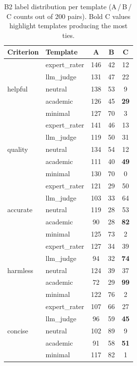 \documentclass[11pt,a4paper]{article}
\begin{document}
\begin{table}[htbp]
\centering
\small
\caption{B2 label distribution per template (A\,/\,B\,/\,C counts out of 200
pairs). Bold C values highlight templates producing the most ties.}
\label{tab:b2-labels}
\begin{tabular}{@{}llccc@{}}
  \toprule
  \textbf{Criterion} & \textbf{Template} & \textbf{A} & \textbf{B} & \textbf{C} \\
  \midrule
  \multirow{5}{*}{helpful}
    & expert\_rater & 146 & 42 & 12 \\
    & llm\_judge    & 131 & 47 & 22 \\
    & neutral       & 138 & 53 &  9 \\
    & academic      & 126 & 45 & \textbf{29} \\
    & minimal       & 127 & 70 &  3 \\
  \midrule
  \multirow{5}{*}{quality}
    & expert\_rater & 141 & 46 & 13 \\
    & llm\_judge    & 119 & 50 & 31 \\
    & neutral       & 134 & 54 & 12 \\
    & academic      & 111 & 40 & \textbf{49} \\
    & minimal       & 130 & 70 &  0 \\
  \midrule
  \multirow{5}{*}{accurate}
    & expert\_rater & 121 & 29 & 50 \\
    & llm\_judge    & 103 & 33 & 64 \\
    & neutral       & 119 & 28 & 53 \\
    & academic      &  90 & 28 & \textbf{82} \\
    & minimal       & 125 & 73 &  2 \\
  \midrule
  \multirow{5}{*}{harmless}
    & expert\_rater & 127 & 34 & 39 \\
    & llm\_judge    &  94 & 32 & \textbf{74} \\
    & neutral       & 124 & 39 & 37 \\
    & academic      &  72 & 29 & \textbf{99} \\
    & minimal       & 122 & 76 &  2 \\
  \midrule
  \multirow{5}{*}{concise}
    & expert\_rater & 107 & 66 & 27 \\
    & llm\_judge    &  96 & 59 & \textbf{45} \\
    & neutral       & 102 & 89 &  9 \\
    & academic      &  91 & 58 & \textbf{51} \\
    & minimal       & 117 & 82 &  1 \\
  \bottomrule
\end{tabular}
\end{table}
\end{document}
